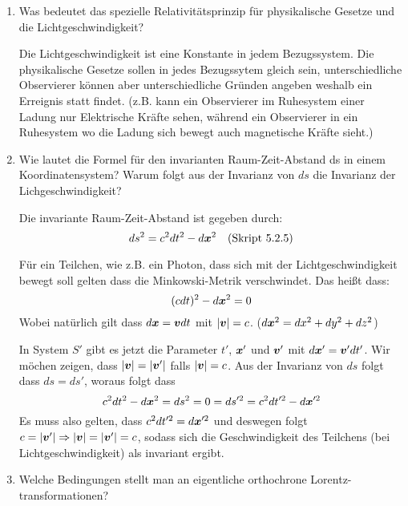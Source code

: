 \begin{enumerate}
  \item Was bedeutet das spezielle Relativitätsprinzip für physikalische
    Gesetze und die Lichtgeschwindigkeit?

    Die Lichtgeschwindigkeit ist eine Konstante in jedem Bezugssystem.
    Die physikalische Gesetze sollen in jedes Bezugssytem gleich sein,
    unterschiedliche Observierer können aber unterschiedliche Gründen
    angeben weshalb ein Erreignis statt findet. (z.B. kann ein Observierer
    im Ruhesystem einer Ladung nur Elektrische Kräfte sehen, während
    ein Observierer in ein Ruhesystem wo die Ladung sich bewegt auch
    magnetische Kräfte sieht.) 

  \item Wie lautet die Formel für den invarianten Raum-Zeit-Abstand ds in
    einem Koordinatensystem? Warum folgt aus der Invarianz von $ds$ die
    Invarianz der Lichgeschwindigkeit?
    
    Die invariante Raum-Zeit-Abstand ist gegeben durch:
    \begin{equation*}
      ds^2 = c^2 dt^2 - d\vb* x^2
      \quad\text{(Skript 5.2.5)}
    \end{equation*}

      Für ein Teilchen, wie z.B. ein Photon, dass sich mit der 
      Lichtgeschwindigkeit bewegt soll gelten dass die Minkowski-Metrik
      verschwindet. Das heißt dass:
      \begin{equation*}
        (cdt)^2 - d\vb* x^2 = 0 
      \end{equation*}
      Wobei natürlich gilt dass $d\vb* x=\vb* vdt$ mit $\abs{\vb* v}=c$.
      ($d\vb* x^2 = dx^2 + dy^2 + dz^2$)

      In System $S'$ gibt es jetzt die Parameter $t'$, $\vb* x'$ und $\vb* v'$
      mit $d\vb* x'=\vb* v'dt'$. Wir möchen zeigen, dass 
      $\abs{\vb* v}=\abs{\vb* v'}$ falls $\abs{\vb* v}=c$.
      Aus der Invarianz von $ds$ folgt dass $ds=ds'$, woraus folgt dass
      \begin{equation*}
        c^2dt^2-d\vb* x^2 = ds^2 = 0 = ds'^2 = c^2dt'^2 - d\vb* x'^2
      \end{equation*}
      Es muss also gelten, dass $c^2dt'^2 = d\vb* x'^2$ und deswegen folgt
      $c=\abs{\vb* v'}\Rightarrow \abs{\vb* v}=\abs{\vb* v'}=c$, 
      sodass sich die Geschwindigkeit 
      des Teilchens (bei Lichtgeschwindigkeit) als invariant ergibt.

  \item Welche Bedingungen stellt man an eigentliche orthochrone
    Lorentz-transformationen?


\end{enumerate}
